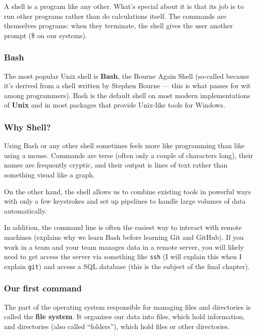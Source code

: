\documentclass[
]{book}
\begin{document}
A shell is a program like any other. What's special about it is that its job is to run other programs rather than do calculations itself. The commands are themselves programs: when they terminate, the shell gives the user another prompt (\$ on our systems).

\subsubsection{Bash}\label{bash}

The most popular Unix shell is \textbf{Bash}, the Bourne Again Shell (so-called because it's derived from a shell written by Stephen Bourne --- this is what passes for wit among programmers). Bash is the default shell on most modern implementations of \textbf{Unix} and in most packages that provide Unix-like tools for Windows.

\subsubsection{Why Shell?}\label{why-shell}

Using Bash or any other shell sometimes feels more like programming than like using a mouse. Commands are terse (often only a couple of characters long), their names are frequently cryptic, and their output is lines of text rather than something visual like a graph.

On the other hand, the shell allows us to combine existing tools in powerful ways with only a few keystrokes and set up pipelines to handle large volumes of data automatically.

In addition, the command line is often the easiest way to interact with remote machines (explains why we learn Bash before learning Git and GitHub). If you work in a team and your team manages data in a remote server, you will likely need to get access the server via something like \texttt{ssh} (I will explain this when I explain \texttt{git}) and access a SQL database (this is the subject of the final chapter).

\subsubsection{Our first command}\label{our-first-command}

The part of the operating system responsible for managing files and directories is called the \textbf{file system}. It organizes our data into files, which hold information, and directories (also called ``folders''), which hold files or other directories.
\end{document}
